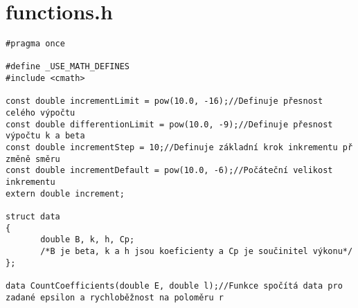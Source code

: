 \section{functions.h}
\begin{mylisting}
\begin{verbatim}
#pragma once

#define _USE_MATH_DEFINES
#include <cmath>

const double incrementLimit = pow(10.0, -16);//Definuje přesnost celého výpočtu
const double differentionLimit = pow(10.0, -9);//Definuje přesnost výpočtu k a beta
const double incrementStep = 10;//Definuje základní krok inkrementu př změně směru
const double incrementDefault = pow(10.0, -6);//Počáteční velikost inkrementu
extern double increment;

struct data
{
       double B, k, h, Cp;
       /*B je beta, k a h jsou koeficienty a Cp je součinitel výkonu*/
};

data CountCoefficients(double E, double l);//Funkce spočítá data pro zadané epsilon a rychloběžnost na poloměru r

\end{verbatim}
\end{mylisting}

